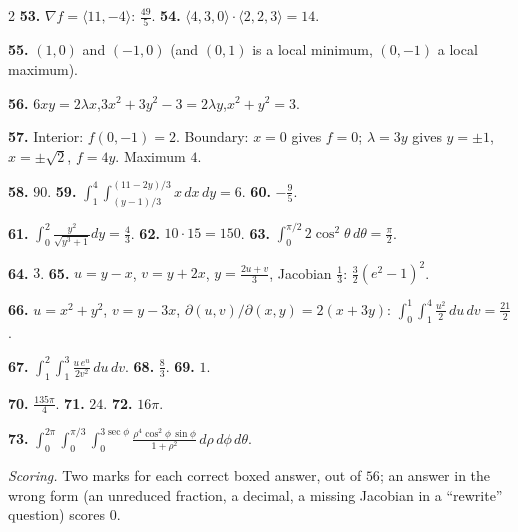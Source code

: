 \documentclass[11pt,oneside]{article}
\newcommand{\grad}{\nabla}
\newcounter{prob}
\begin{document}
{\begin{multicols}{2}
\textbf{53.} $\grad f=\langle11,-4\rangle$: $\tfrac{49}{5}$.\qquad
\textbf{54.} $\langle4,3,0\rangle\cdot\langle2,2,3\rangle=14$.

\textbf{55.} $(1,0)$ and $(-1,0)$ (and $(0,1)$ is a local minimum, $(0,-1)$ a local maximum).

\textbf{56.} $6xy=2\lambda x$,\quad $3x^{2}+3y^{2}-3=2\lambda y$,\quad $x^{2}+y^{2}=3$.

\textbf{57.} Interior: $f(0,-1)=2$. Boundary: $x=0$ gives $f=0$; $\lambda=3y$ gives $y=\pm1$,
$x=\pm\sqrt2$, $f=4y$. Maximum $4$.

\textbf{58.} $90$.\qquad
\textbf{59.} $\int_1^4\!\int_{(y-1)/3}^{(11-2y)/3}x\,dx\,dy=6$.\qquad
\textbf{60.} $-\tfrac95$.

\textbf{61.} $\int_0^2\frac{y^{2}}{\sqrt{y^{3}+1}}dy=\tfrac43$.\qquad
\textbf{62.} $10\cdot15=150$.\qquad
\textbf{63.} $\int_0^{\pi/2}2\cos^{2}\theta\,d\theta=\tfrac{\pi}{2}$.

\textbf{64.} $3$.\qquad
\textbf{65.} $u=y-x$, $v=y+2x$, $y=\tfrac{2u+v}{3}$, Jacobian $\tfrac13$:
$\tfrac32\left(e^{2}-1\right)^{2}$.

\textbf{66.} $u=x^{2}+y^{2}$, $v=y-3x$, $\partial(u,v)/\partial(x,y)=2(x+3y)$:
$\int_0^1\!\int_1^4\tfrac{u^{2}}{2}\,du\,dv=\tfrac{21}{2}$.

\textbf{67.} $\displaystyle\int_1^2\!\!\int_1^3\frac{u\,e^{u}}{2v^{2}}\,du\,dv$.\qquad
\textbf{68.} $\tfrac83$.\qquad
\textbf{69.} $1$.

\textbf{70.} $\tfrac{135\pi}{4}$.\qquad
\textbf{71.} $24$.\qquad
\textbf{72.} $16\pi$.

\textbf{73.} $\displaystyle\int_0^{2\pi}\!\!\int_0^{\pi/3}\!\!\int_0^{3\sec\phi}
\frac{\rho^{4}\cos^{2}\phi\,\sin\phi}{1+\rho^{2}}\,d\rho\,d\phi\,d\theta$.

\vspace{3pt}
\emph{Scoring.} Two marks for each correct boxed answer, out of $56$; an answer in the wrong
form (an unreduced fraction, a decimal, a missing Jacobian in a ``rewrite'' question) scores $0$.

\end{multicols}}

\vspace{10pt}
\noindent{\color{RuleGray}\rule{\linewidth}{0.5pt}}\par\vspace{5pt}
\end{document}
